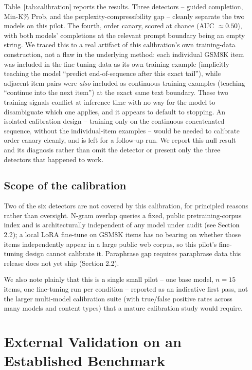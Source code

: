 \documentclass[11pt]{article}
\begin{document}
Table~\ref{tab:calibration} reports the results. Three detectors --
guided completion, Min-K\% Prob, and the perplexity-compressibility gap
-- cleanly separate the two models on this pilot. The fourth,
order canary, scored at chance (AUC $\approx 0.50$), with both models'
completions at the relevant prompt boundary being an empty string. We
traced this to a real artifact of this calibration's own training-data
construction, not a flaw in the underlying method: each individual GSM8K
item was included in the fine-tuning data as its own training example
(implicitly teaching the model ``predict end-of-sequence after this exact
tail''), while adjacent-item pairs were \emph{also} included as
continuous training examples (teaching ``continue into the next item'')
at the exact same text boundary. These two training signals conflict at
inference time with no way for the model to disambiguate which one
applies, and it appears to default to stopping. An isolated calibration
design -- training only on the continuous concatenated sequence, without
the individual-item examples -- would be needed to calibrate order canary
cleanly, and is left for a follow-up run. We report this null result and
its diagnosis rather than omit the detector or present only the three
detectors that happened to work.

\subsection{Scope of the calibration}
\label{sec:scope}

Two of the six detectors are not covered by this calibration, for
principled reasons rather than oversight. N-gram overlap queries a fixed,
public pretraining-corpus index and is architecturally independent of any
model under audit (see Section 2.2); a local LoRA fine-tune on GSM8K items
has no bearing on whether those items independently appear in a
large public web corpus, so this pilot's fine-tuning design cannot
calibrate it. Paraphrase gap requires paraphrase data this release does
not yet ship (Section 2.2).

We also note plainly that this is a single small pilot -- one base
model, $n=15$ items, one fine-tuning run per condition -- reported as an
indicative first pass, not the larger multi-model calibration suite (with
true/false positive rates across many models and content types) that a
mature calibration study would require.

\section{External Validation on an Established Benchmark}
\label{sec:wikimia}
\end{document}
